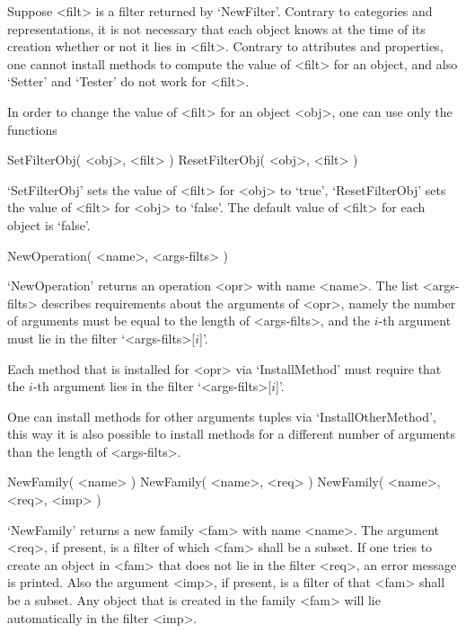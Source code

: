 Suppose <filt> is a filter returned by `NewFilter'.
Contrary to categories and representations, it is not necessary that
each object knows at the time of its creation whether or not it lies in
<filt>.
Contrary to attributes and properties, one cannot install methods to
compute the value of <filt> for an object, and also `Setter' and
`Tester' do not work for <filt>.

In order to change the value of <filt> for an object <obj>,
one can use only the functions

\>SetFilterObj( <obj>, <filt> )
\)ResetFilterObj( <obj>, <filt> )

`SetFilterObj' sets the value of <filt> for <obj> to `true',
`ResetFilterObj' sets the value of <filt> for <obj> to `false'.
The default value of <filt> for each object is `false'.




\>NewOperation( <name>, <args-filts> )

`NewOperation' returns an operation <opr> with name <name>.
The list <args-filts> describes requirements about the arguments
of <opr>, namely the number of arguments must be equal to the length of
<args-filts>, and the $i$-th argument must lie in the filter
`<args-filts>[$i$]'.

Each method that is installed for <opr> via `InstallMethod' must require
that the $i$-th argument lies in the filter `<args-filts>[$i$]'.

One can install methods for other arguments tuples via
`InstallOtherMethod',
this way it is also possible to install methods for a different number
of arguments than the length of <args-filts>.



\>NewFamily( <name> )
\)NewFamily( <name>, <req> )
\)NewFamily( <name>, <req>, <imp> )

`NewFamily' returns a new family <fam> with name <name>.
The argument <req>, if present, is a filter of which <fam> shall be a
subset.
If one tries to create an object in <fam> that does not lie in the filter
<req>, an error message is printed.
Also the argument <imp>, if present, is a filter of that <fam> shall be a
subset.
Any object that is created in the family <fam> will lie automatically in
the filter <imp>.

